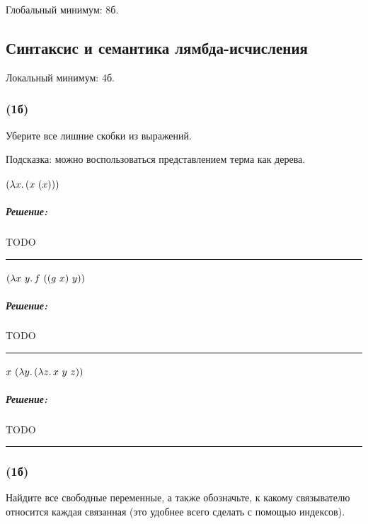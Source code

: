 \documentclass{article}
\newenvironment{proof}{\subparagraph{\hspace{-1em}Решение:\newline}}{\par\noindent\rule{\textwidth}{0.4pt}}
\begin{document}
    Глобальный минимум: 8б.

    \subsection{Синтаксис и семантика лямбда-исчисления}

    Локальный минимум: 4б.

    \subsubsection{(1б)}

    Уберите все лишние скобки из выражений.

    Подсказка: можно воспользоваться представлением терма как дерева.

    \paragraph{}

    $(\lambda x\ldotp (x~(x)))$

    \begin{proof}
        TODO %
    \end{proof}

    \paragraph{}

    $(\lambda x~y \ldotp f~((g~x)~y))$

    \begin{proof}
        TODO %
    \end{proof}

    \paragraph{}

    $x ~ (\lambda y\ldotp (\lambda z \ldotp x~y~z))$

    \begin{proof}
        TODO %
    \end{proof}

    \subsubsection{(1б)}

    Найдите все свободные переменные, а также обозначьте, к какому связывателю относится каждая связанная (это удобнее всего сделать с помощью индексов).
\end{document}
